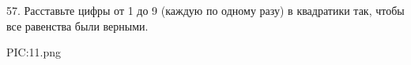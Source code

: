 57. Расставьте цифры от 1 до 9 (каждую по одному разу) в квадратики так, чтобы все равенства были верными.
\begin{center}
{{PIC:11.png}}
\end{center}
